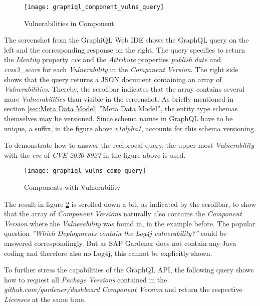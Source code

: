 \begin{figure}[H]
	\centering
	\texttt{[image: graphiql\_component\_vulns\_query]}
	\caption[GraphQL Query Vulnerabilities in Component]{Vulnerabilities in Component }
	\label{fig:VulnsInComp}
\end{figure}

The screenshot from the GraphiQL Web IDE shows the GraphQL query on the left and the corresponding response on the right. The query specifies to return the \emph{Identity} property \emph{cve} and the \emph{Attribute} properties \emph{publish date} and \emph{cvss3\_score} for each \emph{Vulnerability} in the \emph{Component Version}. The right side shows that the query returns a JSON document containing an array of \emph{Vulnerabilities}. Thereby, the scrollbar indicates that the array contains several more \emph{Vulnerabilities} than visible in the screenshot. As briefly mentioned in section \ref{sec:Meta Data Model} ''Meta Data Model'', the entity type schemas themselves may be versioned. Since schema names in GraphQL have to be unique, a suffix, in the figure above \emph{v1alpha1}, accounts for this schema versioning.\par 
To demonstrate how to answer the reciprocal query, the upper most \emph{Vulnerability} with the \emph{cve} of \emph{CVE-2020-8927} in the figure above is used. 

\begin{figure}[H]
	\centering
	\texttt{[image: graphiql\_vulns\_comp\_query]}
	\caption[GraphQL Query Components with Vulnerability]{Components with Vulnerability }
	\label{fig:CompsWithVuln}
\end{figure}

The result in figure \ref{fig:CompsWithVuln} is scrolled down a bit, as indicated by the scrollbar, to show that the array of \emph{Component Versions} naturally also contains the \emph{Component Version} where the \emph{Vulnerability} was found in, in the example before. The popular question \emph{''Which Deployments contain the Log4j vulnerability?''} could be answered correspondingly. But as SAP Gardener does not contain any Java coding and therefore also no Log4j, this cannot be explicitly shown.\par
To further stress the capabilities of the GraphQL API, the following query shows how to request all \emph{Package Versions} contained in the \emph{github.com/gardener/dashboard} \emph{Component Version} and return the respective \emph{Licenses} at the same time.

